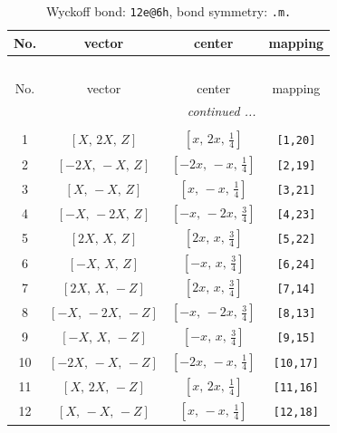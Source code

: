 \documentclass[fleqn,8pt]{jsarticle}
\begin{document}
\renewcommand{\arraystretch}{1.2}
\begin{longtable}{cccc}
\caption{Wyckoff bond: {\tt 12e@6h}, bond symmetry: {\tt .m.}}
 \\
 \hline \hline
No. & vector & center & mapping \\ \hline \endfirsthead

\multicolumn{3}{l}{\tablename\ \thetable{}} \\
 \hline \hline
No. & vector & center & mapping \\ \hline \endhead

 \hline \hline
\multicolumn{3}{r}{\footnotesize\it continued ...} \\ \endfoot

 \hline \hline
\multicolumn{3}{r}{} \\ \endlastfoot

1 & $\left[ X,\, 2 X,\, Z \right]$ & $\left[ x,\, 2 x,\, \frac{1}{4} \right]$ & {\tt [1,20]} \\ \hline
2 & $\left[ - 2 X,\, - X,\, Z \right]$ & $\left[ - 2 x,\, - x,\, \frac{1}{4} \right]$ & {\tt [2,19]} \\ \hline
3 & $\left[ X,\, - X,\, Z \right]$ & $\left[ x,\, - x,\, \frac{1}{4} \right]$ & {\tt [3,21]} \\ \hline
4 & $\left[ - X,\, - 2 X,\, Z \right]$ & $\left[ - x,\, - 2 x,\, \frac{3}{4} \right]$ & {\tt [4,23]} \\ \hline
5 & $\left[ 2 X,\, X,\, Z \right]$ & $\left[ 2 x,\, x,\, \frac{3}{4} \right]$ & {\tt [5,22]} \\ \hline
6 & $\left[ - X,\, X,\, Z \right]$ & $\left[ - x,\, x,\, \frac{3}{4} \right]$ & {\tt [6,24]} \\ \hline
7 & $\left[ 2 X,\, X,\, - Z \right]$ & $\left[ 2 x,\, x,\, \frac{3}{4} \right]$ & {\tt [7,14]} \\ \hline
8 & $\left[ - X,\, - 2 X,\, - Z \right]$ & $\left[ - x,\, - 2 x,\, \frac{3}{4} \right]$ & {\tt [8,13]} \\ \hline
9 & $\left[ - X,\, X,\, - Z \right]$ & $\left[ - x,\, x,\, \frac{3}{4} \right]$ & {\tt [9,15]} \\ \hline
10 & $\left[ - 2 X,\, - X,\, - Z \right]$ & $\left[ - 2 x,\, - x,\, \frac{1}{4} \right]$ & {\tt [10,17]} \\ \hline
11 & $\left[ X,\, 2 X,\, - Z \right]$ & $\left[ x,\, 2 x,\, \frac{1}{4} \right]$ & {\tt [11,16]} \\ \hline
12 & $\left[ X,\, - X,\, - Z \right]$ & $\left[ x,\, - x,\, \frac{1}{4} \right]$ & {\tt [12,18]} \\
\end{longtable}
\end{document}
